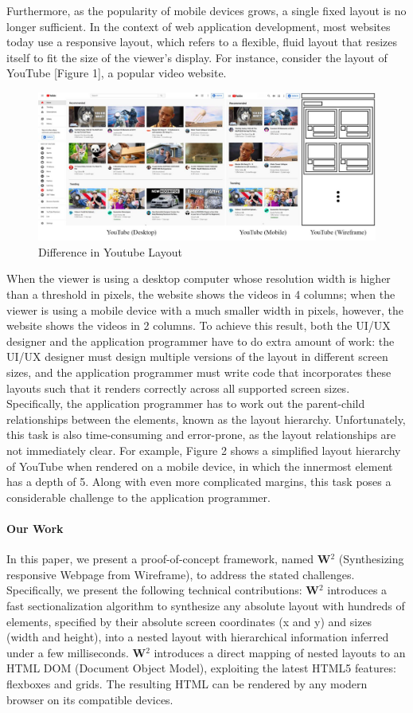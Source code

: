\documentclass[runningheads]{llncs}
\newcommand{\W}{\textbf{W}$^2$ }
\begin{document}
Furthermore, as the popularity of mobile devices grows, a single fixed layout is no longer sufficient. In the context of web application development, most websites today use a responsive layout, which refers to a flexible, fluid layout that resizes itself to fit the size of the viewer's display. For instance, consider the layout of YouTube [Figure 1], a popular video website.
\begin{figure}[H]
  \vspace*{-0.1in}
  \includegraphics[width=1\textwidth]{src/youtube.JPG}
  \caption{Difference in Youtube Layout}
\end{figure}
When the viewer is using a desktop computer whose resolution width is higher than a threshold in pixels, the website shows the videos in 4 columns; when the viewer is using a mobile device with a much smaller width in pixels, however, the website shows the videos in 2 columns. To achieve this result, both the UI/UX designer and the application programmer have to do extra amount of work: the UI/UX designer must design multiple versions of the layout in different screen sizes, and the application programmer must write code that incorporates these layouts such that it renders correctly across all supported screen sizes. Specifically, the application programmer has to work out the parent-child relationships between the elements, known as the layout hierarchy. Unfortunately, this task is also time-consuming and error-prone, as the layout relationships are not immediately clear. For example, Figure 2 shows a simplified layout hierarchy of YouTube when rendered on a mobile device, in which the innermost element has a depth of 5. Along with even more complicated margins, this task poses a considerable challenge to the application programmer.
\paragraph{Our Work} In this paper, we present a proof-of-concept framework, named \W (Synthesizing responsive Webpage from Wireframe), to address the stated challenges. Specifically, we present the following technical contributions:
\W introduces a fast sectionalization algorithm to synthesize any absolute layout with hundreds of elements, specified by their absolute screen coordinates (x and y) and sizes (width and height), into a nested layout with hierarchical information inferred under a few milliseconds.
\W introduces a direct mapping of nested layouts to an HTML DOM (Document Object Model), exploiting the latest HTML5 features: flexboxes and grids. The resulting HTML can be rendered by any modern browser on its compatible devices.
\end{document}
